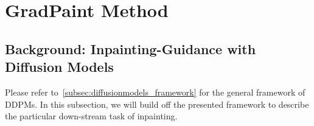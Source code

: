 \section{GradPaint Method}



\subsection{Background: Inpainting-Guidance with Diffusion Models}\label{background}

Please refer to~\ref{subsec:diffusionmodels_framework} for the general framework of \ac{DDPM}s. 
In this subsection, we will build off the presented framework to describe the particular down-stream task of inpainting. 







